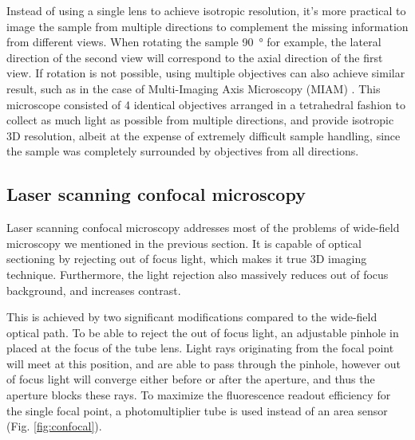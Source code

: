   Instead of using a single lens to achieve isotropic resolution, it's more practical to image the sample from multiple directions to complement the missing information from different views. When rotating the sample \SI{90}{\degree} for example, the lateral direction of the second view will correspond to the axial direction of the first view. If rotation is not possible, using multiple objectives can also achieve similar result, such as in the case of Multi-Imaging Axis Microscopy (MIAM) \cite{swoger_multiple_2003,swoger_multi-view_2007}. This microscope consisted of 4 identical objectives arranged in a tetrahedral fashion to collect as much light as possible from multiple directions, and provide isotropic 3D resolution, albeit at the expense of extremely difficult sample handling, since the sample was completely surrounded by objectives from all directions. 





  \subsection{Laser scanning confocal microscopy}
    Laser scanning confocal microscopy \cite{minsky_microscopy_1961,davidovits_scanning_1969} addresses most of the problems of wide-field microscopy we mentioned in the previous section. It is capable of optical sectioning by rejecting out of focus light, which makes it  true 3D imaging technique. Furthermore, the light rejection also massively reduces out of focus background, and increases contrast.

    This is achieved by two significant modifications compared to the wide-field optical path. To be able to reject the out of focus light, an adjustable pinhole in placed at the focus of the tube lens. Light rays originating from the focal point will meet at this position, and are able to pass through the pinhole, however out of focus light will converge either before or after the aperture, and thus the aperture blocks these rays. To maximize the fluorescence readout efficiency for the single focal point, a photomultiplier tube is used instead of an area sensor (Fig. \ref{fig:confocal}).

